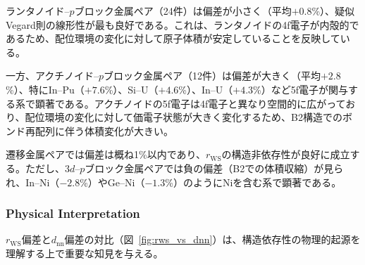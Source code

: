 \documentclass[a4paper,10pt,5p]{elsarticle}
\begin{document}
\begin{table}[htbp]
\small
    \centering
    \caption{B2 $r_\mathrm{WS}$ deviation from L1$_2$ interpolation classified by element-pair type. Positive values indicate B2 volume expansion relative to L1$_2$ interpolation.}
    \label{tab:rws_deviation_groups}
\end{table}

ランタノイド--$p$ブロック金属ペア（24件）は偏差が小さく（平均$+0.8$\%）、疑似Vegard則の線形性が最も良好である。これは、ランタノイドの4f電子が内殻的であるため、配位環境の変化に対して原子体積が安定していることを反映している。

一方、アクチノイド--$p$ブロック金属ペア（12件）は偏差が大きく（平均$+2.8$\%）、特にIn--Pu（$+7.6$\%）、Si--U（$+4.6$\%）、In--U（$+4.3$\%）など5f電子が関与する系で顕著である。アクチノイドの5f電子は4f電子と異なり空間的に広がっており、配位環境の変化に対して価電子状態が大きく変化するため、B2構造でのボンド再配列に伴う体積変化が大きい。

遷移金属ペアでは偏差は概ね1\%以内であり、$r_\mathrm{WS}$の構造非依存性が良好に成立する。ただし、3$d$--$p$ブロック金属ペアでは負の偏差（B2での体積収縮）が見られ、In--Ni（$-2.8$\%）やGe--Ni（$-1.3$\%）のようにNiを含む系で顕著である。

\subsubsection{Physical Interpretation}

$r_\mathrm{WS}$偏差と$d_\mathrm{nn}$偏差の対比（図~\ref{fig:rws_vs_dnn}）は、構造依存性の物理的起源を理解する上で重要な知見を与える。
\end{document}
